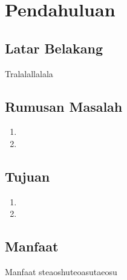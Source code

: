 \chapter{Pendahuluan} \label{cha:Pendahuluan}


\section{Latar Belakang} \label{sec:Latar Belakang}
Tralalallalala

\section{Rumusan Masalah} \label{sec:Rumusan Masalah}
\begin{enumerate}
    \item \RumA{}
    \item \RumB{}
\end{enumerate}

\section{Tujuan} \label{sec:Tujuan}
\begin{enumerate}
    \item \TujA{}
    \item \TujB{}
\end{enumerate}

\section{Manfaat} \label{sec:Manfaat}

Manfaat steaoshuteoasutaeosu
